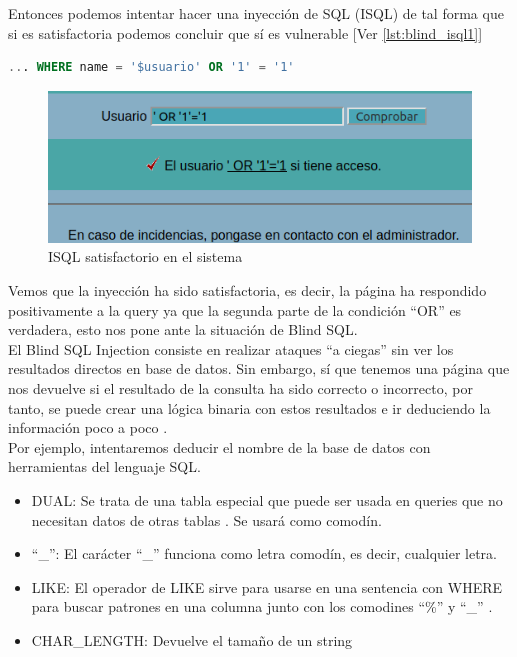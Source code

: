 \documentclass[a4paper,oneside]{article}
\begin{document}
Entonces podemos intentar hacer una inyección de SQL (ISQL) de tal forma que si es satisfactoria podemos concluir que sí es vulnerable [Ver \ref{lst:blind_isql1}]
\begin{lstlisting}[language=SQL, caption={Intento de ISQL en el sistema}, label={lst:blind_isql1}]
... WHERE name = '$usuario' OR '1' = '1'
\end{lstlisting}

\begin{figure}[h!]
  \centering
  \includegraphics[scale=0.8]{images/blindsql2.png}
  \caption{ISQL satisfactorio en el sistema}
  \label{fig:blindsql2}
\end{figure}

Vemos que la inyección ha sido satisfactoria, es decir, la página ha respondido positivamente a la query ya que la segunda parte de la condición ``OR'' es verdadera, esto nos pone ante la situación de Blind SQL.\\

El Blind SQL Injection consiste en realizar ataques ``a ciegas'' sin ver los resultados directos en base de datos. Sin embargo, sí que tenemos una página que nos devuelve si el resultado de la consulta ha sido correcto o incorrecto, por tanto, se puede crear una lógica binaria con estos resultados e ir deduciendo la información poco a poco \cite{owasp}.\\

Por ejemplo, intentaremos deducir el nombre de la base de datos con herramientas del lenguaje SQL.\\
\begin{itemize}
\item DUAL: Se trata de una tabla especial que puede ser usada en queries que no necesitan datos de otras tablas \cite{dual}. Se usará como comodín.
\item ``\_'': El carácter ``\_'' funciona como letra comodín, es decir, cualquier letra.
\item LIKE: El operador de LIKE sirve para usarse en una sentencia con WHERE para buscar patrones en una columna junto con los comodines ``\%'' y ``\_'' \cite{like}.
\item CHAR\_LENGTH: Devuelve el tamaño de un string
\end{itemize}
\end{document}
